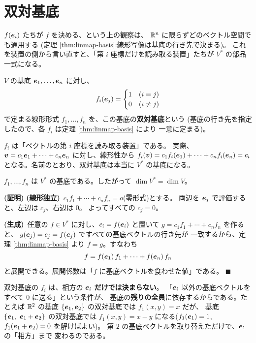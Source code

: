 \section{双対基底}

$f(\bm{e}_i)$ たちが $f$ を決める、という上の観察は、
$\mathbb{R}^n$ に限らずどのベクトル空間でも通用する
(定理 \ref{thm:linmap-basis}:線形写像は基底の行き先で決まる)。
これを装置の側から言い直すと、「第 $i$ 座標だけを読み取る装置」たちが
$V^{*}$ の部品一式になる。

\begin{teigi}[双対基底]
$V$ の基底 $\bm{e}_1, \dots, \bm{e}_n$ に対し、
\[
f_i(\bm{e}_j) = \begin{cases} 1 & (i = j) \\ 0 & (i \neq j) \end{cases}
\]
で定まる線形形式 $f_1, \dots, f_n$ を、この基底の\textbf{双対基底}という
(基底の行き先を指定したので、各 $f_i$ は定理 \ref{thm:linmap-basis} により
一意に定まる)。
\end{teigi}

$f_i$ は「ベクトルの第 $i$ 座標を読み取る装置」である。
実際、$\bm{v} = c_1\bm{e}_1 + \cdots + c_n\bm{e}_n$ に対し、線形性から
$f_i(\bm{v}) = c_1 f_i(\bm{e}_1) + \cdots + c_n f_i(\bm{e}_n) = c_i$
となる。名前のとおり、双対基底は本当に $V^{*}$ の基底になる。

\begin{teiri}\label{thm:dual-basis}
$f_1, \dots, f_n$ は $V^{*}$ の基底である。したがって
$\dim V^{*} = \dim V$。
\end{teiri}

\noindent\textbf{(証明)}\quad
\textbf{(線形独立)}\ $c_1 f_1 + \cdots + c_n f_n = o$(零形式)とする。
両辺を $\bm{e}_j$ で評価すると、左辺は $c_j$、右辺は $0$。
よってすべての $c_j = 0$。

\textbf{(生成)}\ 任意の $f \in V^{*}$ に対し、$c_i = f(\bm{e}_i)$ と置いて
$g = c_1 f_1 + \cdots + c_n f_n$ を作ると、
$g(\bm{e}_j) = c_j = f(\bm{e}_j)$ ですべての基底ベクトルの行き先が
一致するから、定理 \ref{thm:linmap-basis} より $f = g$。すなわち
\[
f = f(\bm{e}_1)\,f_1 + \cdots + f(\bm{e}_n)\,f_n
\]
と展開できる。展開係数は「$f$ に基底ベクトルを食わせた値」である。
$\blacksquare$

\begin{chui}
双対基底の $f_i$ は、相方の $\bm{e}_i$ \textbf{だけでは決まらない}。
「$\bm{e}_i$ 以外の基底ベクトルをすべて $0$ に送る」という条件が、
基底の\textbf{残りの全員}に依存するからである。たとえば $\mathbb{R}^2$ の基底
$\{\bm{e}_1, \bm{e}_2\}$ の双対基底では $f_1(x, y) = x$ だが、
基底 $\{\bm{e}_1,\ \bm{e}_1 + \bm{e}_2\}$ の双対基底では
$f_1(x, y) = x - y$ になる($f_1(\bm{e}_1) = 1$,
$f_1(\bm{e}_1 + \bm{e}_2) = 0$ を解けばよい)。
第 $2$ の基底ベクトルを取り替えただけで、$\bm{e}_1$ の「相方」まで
変わるのである。
\end{chui}

